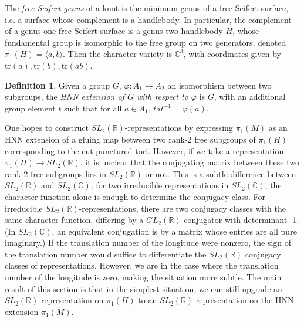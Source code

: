 \documentclass{article}
\theoremstyle{plain}
\theoremstyle{definition}
\newtheorem{definition}[theorem]{Definition}
\theoremstyle{plain}
\theoremstyle{plain}
\theoremstyle{plain}
\theoremstyle{remark}
\newtheorem{remark}[theorem]{Remark}
\theoremstyle{remark}
\theoremstyle{plain}
\theoremstyle{plain}
\begin{document}

The \emph{free Seifert genus} of a knot is the minimum genus of a free Seifert surface, i.e. a surface whose complement is a handlebody. In particular, the complement of a genus one free Seifert surface is a genus two handlebody $H$, whose fundamental group is isomorphic to the free group on two generators, denoted $\pi_1(H) = \langle a, b \rangle$. Then the character variety is $\mathbb{C}^3$, with coordinates given by $\text{tr}(a), \text{tr}(b), \text{tr}(ab)$. 

\begin{definition}
Given a group $G$, $\varphi: A_1 \to A_2$ an isomorphism between two subgroups, the \emph{HNN extension of $G$ with respect to $\varphi$} is $G$, with an additional group element $t$ such that for all $a \in A_1$, $tat^{-1} = \varphi(a)$. 
\end{definition} 

One hopes to construct $SL_2(\mathbb{R})$-representations by expressing $\pi_1(M)$ as an HNN extension of a gluing map between two rank-2 free subgroups of $\pi_1(H)$ corresponding to the cut punctured tori. However, if we take a representation $\pi_1(H) \to SL_2(\mathbb{R})$, it is unclear that the conjugating matrix between these two rank-2 free subgroups lies in $SL_2(\mathbb{R})$ or not. This is a subtle difference between $SL_2(\mathbb{R})$ and $SL_2(\mathbb{C})$; for two irreducible representations in $SL_2(\mathbb{C})$, the character function alone is enough to determine the conjugacy class. For irreducible $SL_2(\mathbb{R})$-representations, there are two conjugacy classes with the same character function, differing by a $GL_2(\mathbb{R})$ conjugator with determinant -1. (In $SL_2(\mathbb{C})$, an equivalent conjugation is by a matrix whose entries are all pure imaginary.) If the translation number of the longitude were nonzero, the sign of the translation number would suffice to differentiate the $SL_2(\mathbb{R})$ conjugacy classes of representations. However, we are in the case where the translation number of the longitude is zero, making the situation more subtle. The main result of this section is that in the simplest situation, we can still upgrade an $SL_2(\mathbb{R})$-representation on $\pi_1(H)$ to an $SL_2(\mathbb{R})$-representation on the HNN extension $\pi_1(M)$. 
\end{document}
